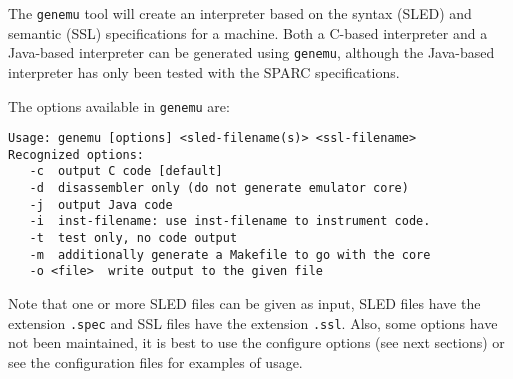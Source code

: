 The \texttt{genemu} tool will create an interpreter based on 
the syntax (SLED) and semantic (SSL) specifications for a machine. 
Both a C-based interpreter and a Java-based interpreter can 
be generated using \texttt{genemu}, although the Java-based interpreter
has only been tested with the SPARC specifications. 

The options available in \texttt{genemu} are: 
\begin{verbatim}
Usage: genemu [options] <sled-filename(s)> <ssl-filename>
Recognized options:
   -c  output C code [default]
   -d  disassembler only (do not generate emulator core)
   -j  output Java code
   -i  inst-filename: use inst-filename to instrument code.
   -t  test only, no code output
   -m  additionally generate a Makefile to go with the core
   -o <file>  write output to the given file
\end{verbatim}

Note that one or more SLED files can be given as input, SLED files
have the extension \texttt{.spec} and SSL files have the extension 
\texttt{.ssl}.  Also, some options have not been maintained, it is 
best to use the configure options (see next sections) or see the 
configuration files for examples of usage.  


